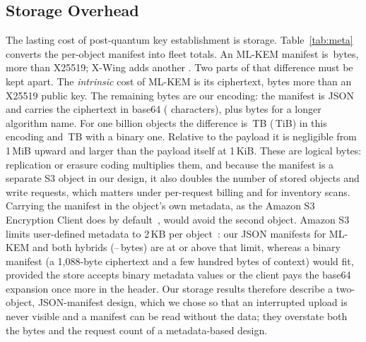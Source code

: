 \documentclass[review,12pt]{elsarticle}
\begin{document}
\subsection{Storage Overhead}\label{sec:metadata}
The lasting cost of post-quantum key establishment is storage. Table~\ref{tab:meta} converts the
per-object manifest into fleet totals. An ML-KEM manifest is \RevMetaMLKEM\,bytes,
\RevMetaExtraMLKEM{} more than X25519; X-Wing adds another \RevMetaXwingOverMLKEM. Two parts of
that difference must be kept apart. The \emph{intrinsic} cost of ML-KEM is its ciphertext,
\RevMetaIntrinsic{} bytes more than an X25519 public key. The remaining
\RevMetaEncodingOverhead{} bytes are our encoding: the manifest is JSON and carries the
ciphertext in base64 (\RevMetaBaseSixtyFour{} characters), plus \RevMetaNameBytes{} bytes for a
longer algorithm name. For one billion objects the difference is \RevMetaBillionTB\,TB
(\RevMetaBillionTiB\,TiB) in this encoding and \RevMetaIntrinsicBillionTB\,TB with a binary
one.
Relative to the payload it is negligible from 1\,MiB upward and larger than the payload itself at
1\,KiB. These are logical bytes: replication or erasure coding multiplies them, and because the
manifest is a separate S3 object in our design, it also doubles the number of stored objects and
write requests, which matters under per-request billing and for inventory scans. Carrying the
manifest in the object's own metadata, as the Amazon S3 Encryption Client does by
default~\cite{s3ec}, would avoid the second object. Amazon S3 limits user-defined metadata to
2\,KB per object~\cite{s3metadata}: our JSON manifests for ML-KEM and both hybrids
(\RevMetaMLKEM--\RevMetaStudyHybrid\,bytes) are at or above that limit, whereas a binary
manifest (a 1{,}088-byte ciphertext and a few hundred bytes of context) would fit, provided the
store accepts binary metadata values or the client pays the base64 expansion once more in the
header. Our storage results therefore describe a two-object, JSON-manifest design, which we
chose so that an interrupted upload is never visible and a manifest can be read without the
data; they overstate both the bytes and the request count of a metadata-based design.

\begin{table}[!htbp]
\caption{Manifest size per object and its scaling, for this study's JSON/base64 manifest. Extra bytes are relative to X25519; \RevMetaIntrinsic{} of ML-KEM's \RevMetaExtraMLKEM{} are ciphertext, the rest is encoding.}
\label{tab:meta}
\centering\footnotesize
\setlength{\tabcolsep}{2.5pt}
\end{table}
\end{document}
